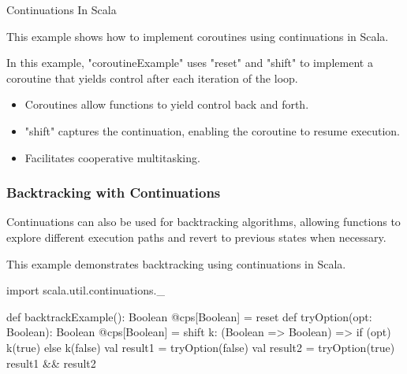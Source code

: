 \begin{notes}{Continuations In Scala}
\begin{highlight}
        This example shows how to implement coroutines using continuations in Scala.
    
    
        In this example, "coroutineExample" uses "reset" and "shift" to implement a coroutine that yields control after each iteration of the loop.
    
        \begin{itemize}
            \item Coroutines allow functions to yield control back and forth.
            \item "shift" captures the continuation, enabling the coroutine to resume execution.
            \item Facilitates cooperative multitasking.
        \end{itemize}
    
    \end{highlight}
    
    \subsubsection*{Backtracking with Continuations}
    
    Continuations can also be used for backtracking algorithms, allowing functions to explore different execution paths and revert to previous states when necessary.
    
    \begin{highlight}
    
        This example demonstrates backtracking using continuations in Scala.
    
    \begin{code}[Scala]
    import scala.util.continuations._
    
    def backtrackExample(): Boolean @cps[Boolean] = reset {
        def tryOption(opt: Boolean): Boolean @cps[Boolean] = shift { k: (Boolean => Boolean) =>
            if (opt) k(true) else k(false)
        }
        val result1 = tryOption(false)
        val result2 = tryOption(true)
        result1 && result2
    }
    

\end{code}
\end{highlight}
\end{notes}
